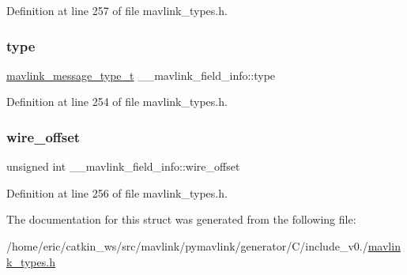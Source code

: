 Definition at line 257 of file mavlink\+\_\+types.\+h.

\mbox{\label{struct____mavlink__field__info_a32f98e7c869ae1567c4ad366c74b6552}} 
\subsubsection{\texorpdfstring{type}{type}}
{\footnotesize\ttfamily \mbox{\hyperlink{include__v0_89_2mavlink__types_8h_ab6045b7adc25bdc05a5011a91dc645a4}{mavlink\+\_\+message\+\_\+type\+\_\+t}} \+\_\+\+\_\+mavlink\+\_\+field\+\_\+info\+::type}



Definition at line 254 of file mavlink\+\_\+types.\+h.

\mbox{\label{struct____mavlink__field__info_a7156648575e497f112fde78e851dd4d9}} 
\subsubsection{\texorpdfstring{wire\_offset}{wire\_offset}}
{\footnotesize\ttfamily unsigned int \+\_\+\+\_\+mavlink\+\_\+field\+\_\+info\+::wire\+\_\+offset}



Definition at line 256 of file mavlink\+\_\+types.\+h.



The documentation for this struct was generated from the following file\+:\begin{DoxyCompactItemize}
\item 
/home/eric/catkin\+\_\+ws/src/mavlink/pymavlink/generator/\+C/include\+\_\+v0./\mbox{\hyperlink{include__v0_89_2mavlink__types_8h}{mavlink\+\_\+types.\+h}}\end{DoxyCompactItemize}
